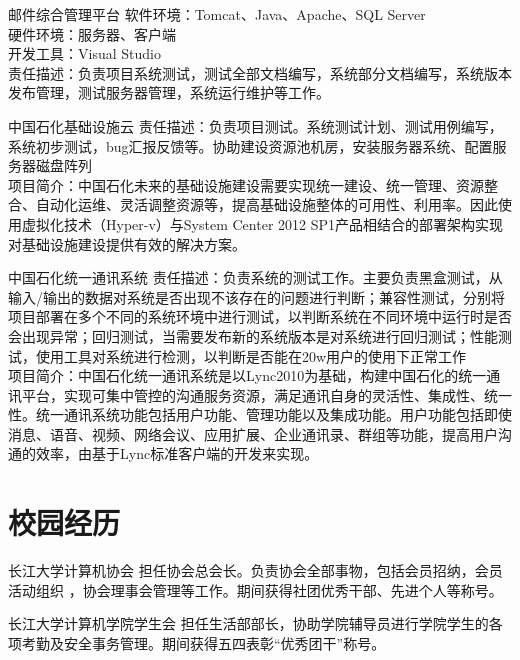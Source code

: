 \documentclass[11pt,a4paper]{moderncv}
\begin{document}
{邮件综合管理平台}
{}
{}{}
{软件环境：Tomcat、Java、Apache、SQL Server\\
硬件环境：服务器、客户端\\
开发工具：Visual Studio\\
责任描述：负责项目系统测试，测试全部文档编写，系统部分文档编写，系统版本发布管理，测试服务器管理，系统运行维护等工作。
}

{中国石化基础设施云}
{}
{}{}
{责任描述：负责项目测试。系统测试计划、测试用例编写，系统初步测试，bug汇报反馈等。协助建设资源池机房，安装服务器系统、配置服务器磁盘阵列\\
项目简介：中国石化未来的基础设施建设需要实现统一建设、统一管理、资源整合、自动化运维、灵活调整资源等，提高基础设施整体的可用性、利用率。因此使用虚拟化技术（Hyper-v）与System Center 2012 SP1产品相结合的部署架构实现对基础设施建设提供有效的解决方案。}

{中国石化统一通讯系统}
{}
{}{}
{责任描述：负责系统的测试工作。主要负责黑盒测试，从输入/输出的数据对系统是否出现不该存在的问题进行判断；兼容性测试，分别将项目部署在多个不同的系统环境中进行测试，以判断系统在不同环境中运行时是否会出现异常；回归测试，当需要发布新的系统版本是对系统进行回归测试；性能测试，使用工具对系统进行检测，以判断是否能在20w用户的使用下正常工作\\
项目简介：中国石化统一通讯系统是以Lync2010为基础，构建中国石化的统一通讯平台，实现可集中管控的沟通服务资源，满足通讯自身的灵活性、集成性、统一性。统一通讯系统功能包括用户功能、管理功能以及集成功能。用户功能包括即使消息、语音、视频、网络会议、应用扩展、企业通讯录、群组等功能，提高用户沟通的效率，由基于Lync标准客户端的开发来实现。
}

\section{校园经历}
\renewcommand{\baselinestretch}{1.2}

{长江大学计算机协会}
{}
{}{}
{担任协会总会长。负责协会全部事物，包括会员招纳，会员活动组织 ，协会理事会管理等工作。期间获得社团优秀干部、先进个人等称号。}

{长江大学计算机学院学生会}
{}
{}{}
{担任生活部部长，协助学院辅导员进行学院学生的各项考勤及安全事务管理。期间获得五四表彰“优秀团干”称号。}
\end{document}

